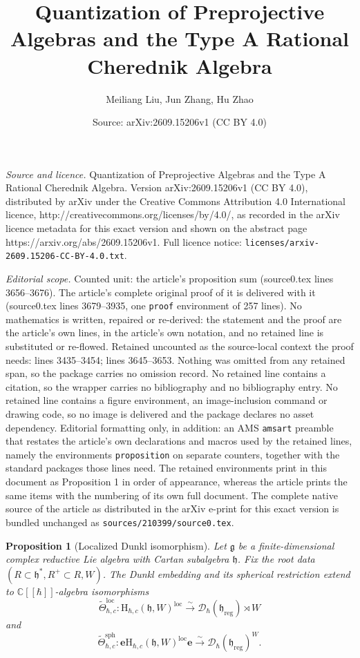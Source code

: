 \documentclass[10pt,a4paper]{amsart}
\title{Quantization of Preprojective Algebras and the Type A Rational Cherednik Algebra}
\author{Meiliang Liu, Jun Zhang, Hu Zhao}
\date{Source: arXiv:2609.15206v1 (CC BY 4.0)}
\newtheorem{proposition}{Proposition}
\newcommand{\bbC}{\mathbb{C}}
\newcommand{\be}{\mathbf{e}}
\newcommand{\fkg}{\mathfrak{g}}
\newcommand{\fkh}{\mathfrak{h}}
\newcommand{\loc}{{\mathrm{loc}}}
\newcommand{\mD}{\mathcal{D}}
\newcommand{\reg}{\mathrm{reg}}
\newcommand{\rmH}{\mathrm{H}}
\newcommand{\sph}{{\mathrm{sph}}}
\begin{document}
\maketitle

\noindent\emph{Source and licence.} Quantization of Preprojective Algebras and the Type A Rational Cherednik Algebra. Version arXiv:2609.15206v1 (CC BY 4.0), distributed by arXiv under the Creative Commons Attribution 4.0 International licence, http://creativecommons.org/licenses/by/4.0/, as recorded in the arXiv licence metadata for this exact version and shown on the abstract page https://arxiv.org/abs/2609.15206v1. Full licence notice: \texttt{licenses/arxiv-2609.15206-CC-BY-4.0.txt}.\par\smallskip

\noindent\textit{Editorial scope.} Counted unit: the article's proposition sum (source0.tex lines 3656--3676). The article's complete original proof of it is delivered with it (source0.tex lines 3679--3935, one \texttt{proof} environment of 257 lines). No mathematics is written, repaired or re-derived: the statement and the proof are the article's own lines, in the article's own notation, and no retained line is substituted or re-flowed.  Retained uncounted as the source-local context the proof needs: lines 3435--3454; lines 3645--3653.  Nothing was omitted from any retained span, so the package carries no omission record.  No retained line contains a citation, so the wrapper carries no bibliography and no bibliography entry.  No retained line contains a figure environment, an image-inclusion command or drawing code, so no image is delivered and the package declares no asset dependency.  Editorial formatting only, in addition: an AMS \texttt{amsart} preamble that restates the article's own declarations and macros used by the retained lines, namely the environments \texttt{proposition} on separate counters, together with the standard packages those lines need.  The retained environments print in this document as Proposition 1 in order of appearance, whereas the article prints the same items with the numbering of its own full document.  The complete native source of the article as distributed in the arXiv e-print for this exact version is bundled unchanged as \texttt{sources/210399/source0.tex}.
\begin{proposition}[Localized Dunkl isomorphism]
\label{prop: dunkl embed loc neq 0}
Let \(\fkg\) be a finite-dimensional complex reductive Lie algebra with Cartan subalgebra \(\fkh\).
	Fix the root data \((R\subset\fkh^*, R^+ \subset R, W)\).
	The Dunkl embedding and its spherical restriction extend to
	\(\bbC[[\hbar]]\)-algebra isomorphisms
	\[
	\widetilde\Theta_{\hbar,c}^{\loc}:
	\rmH_{\hbar,c}(\fkh,W)^\loc
	\xrightarrow{\sim}
	\mD_\hbar(\fkh_{\reg})\rtimes W
	\]
	and
	\[
	\widetilde\Theta_{\hbar,c}^{\sph}:
	\be\rmH_{\hbar,c}(\fkh,W)^\loc\be
	\xrightarrow{\sim}
	\mD_\hbar(\fkh_{\reg})^W.
	\]
\end{proposition}
\end{document}
